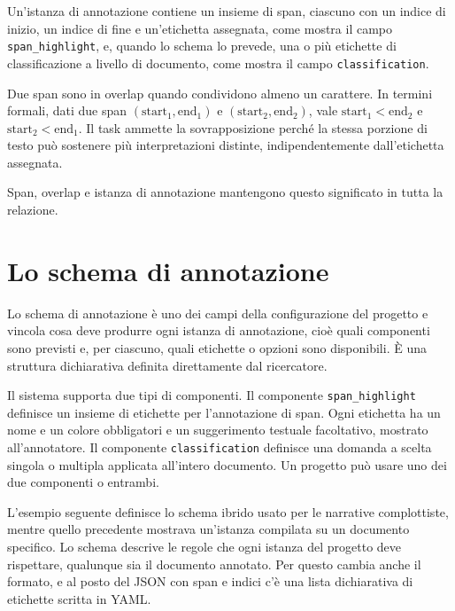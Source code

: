 \documentclass[]{sapthesis}
\begin{document}
Un'istanza di annotazione contiene un insieme di span, ciascuno con un indice di inizio, un indice di fine e un'etichetta assegnata, come mostra il campo \verb|span_highlight|, e, quando lo schema lo prevede, una o più etichette di classificazione a livello di documento, come mostra il campo \verb|classification|.

Due span sono in overlap quando condividono almeno un carattere. In termini formali, dati due span $(\text{start}_1, \text{end}_1)$ e $(\text{start}_2, \text{end}_2)$, vale $\text{start}_1 < \text{end}_2$ e $\text{start}_2 < \text{end}_1$. Il task ammette la sovrapposizione perché la stessa porzione di testo può sostenere più interpretazioni distinte, indipendentemente dall'etichetta assegnata.

Span, overlap e istanza di annotazione mantengono questo significato in tutta la relazione.

\section{Lo schema di annotazione}
\label{sec:schema}

Lo schema di annotazione è uno dei campi della configurazione del progetto e vincola cosa deve produrre ogni istanza di annotazione, cioè quali componenti sono previsti e, per ciascuno, quali etichette o opzioni sono disponibili. È una struttura dichiarativa definita direttamente dal ricercatore.

Il sistema supporta due tipi di componenti. Il componente \verb|span_highlight| definisce un insieme di etichette per l'annotazione di span. Ogni etichetta ha un nome e un colore obbligatori e un suggerimento testuale facoltativo, mostrato all'annotatore. Il componente \verb|classification| definisce una domanda a scelta singola o multipla applicata all'intero documento. Un progetto può usare uno dei due componenti o entrambi.

L'esempio seguente definisce lo schema ibrido usato per le narrative complottiste, mentre quello precedente mostrava un'istanza compilata su un documento specifico. Lo schema descrive le regole che ogni istanza del progetto deve rispettare, qualunque sia il documento annotato. Per questo cambia anche il formato, e al posto del JSON con span e indici c'è una lista dichiarativa di etichette scritta in YAML.
\end{document}
